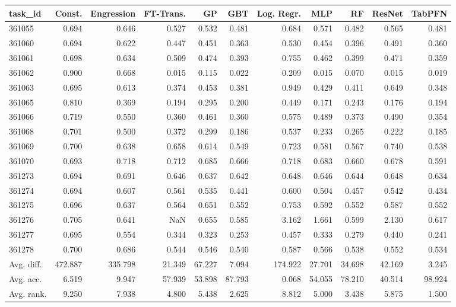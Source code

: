 \begin{tabular}{lrrrrrrrrrr}
\toprule
task\_id & Const. & Engression & FT-Trans. & GP & GBT & Log. Regr. & MLP & RF & ResNet & TabPFN \\
\midrule
361055 & 0.694 & 0.646 & 0.527 & 0.532 & 0.481 & 0.684 & 0.571 & 0.482 & 0.565 & 0.481 \\
361060 & 0.694 & 0.622 & 0.447 & 0.451 & 0.363 & 0.530 & 0.454 & 0.396 & 0.491 & 0.360 \\
361061 & 0.698 & 0.634 & 0.509 & 0.474 & 0.393 & 0.755 & 0.462 & 0.399 & 0.471 & 0.359 \\
361062 & 0.900 & 0.668 & 0.015 & 0.115 & 0.022 & 0.209 & 0.015 & 0.070 & 0.015 & 0.019 \\
361063 & 0.695 & 0.613 & 0.374 & 0.453 & 0.381 & 0.949 & 0.429 & 0.411 & 0.649 & 0.348 \\
361065 & 0.810 & 0.369 & 0.194 & 0.295 & 0.200 & 0.449 & 0.171 & 0.243 & 0.176 & 0.194 \\
361066 & 0.719 & 0.550 & 0.360 & 0.461 & 0.360 & 0.575 & 0.489 & 0.373 & 0.490 & 0.354 \\
361068 & 0.701 & 0.500 & 0.372 & 0.299 & 0.186 & 0.537 & 0.233 & 0.265 & 0.222 & 0.185 \\
361069 & 0.700 & 0.638 & 0.658 & 0.614 & 0.549 & 0.723 & 0.581 & 0.567 & 0.740 & 0.538 \\
361070 & 0.693 & 0.718 & 0.712 & 0.685 & 0.666 & 0.718 & 0.683 & 0.660 & 0.678 & 0.591 \\
361273 & 0.694 & 0.691 & 0.646 & 0.637 & 0.642 & 0.648 & 0.646 & 0.644 & 0.648 & 0.634 \\
361274 & 0.694 & 0.607 & 0.561 & 0.535 & 0.441 & 0.600 & 0.504 & 0.457 & 0.542 & 0.434 \\
361275 & 0.696 & 0.637 & 0.564 & 0.651 & 0.552 & 0.753 & 0.592 & 0.552 & 0.587 & 0.552 \\
361276 & 0.705 & 0.641 & NaN & 0.655 & 0.585 & 3.162 & 1.661 & 0.599 & 2.130 & 0.617 \\
361277 & 0.695 & 0.554 & 0.344 & 0.323 & 0.253 & 0.457 & 0.333 & 0.279 & 0.440 & 0.241 \\
361278 & 0.700 & 0.686 & 0.544 & 0.546 & 0.540 & 0.587 & 0.566 & 0.538 & 0.552 & 0.534 \\
Avg. diff. & 472.887 & 335.798 & 21.349 & 67.227 & 7.094 & 174.922 & 27.701 & 34.698 & 42.169 & 3.245 \\
Avg. acc. & 6.519 & 9.947 & 57.939 & 53.898 & 87.793 & 0.068 & 54.055 & 78.210 & 40.514 & 98.924 \\
Avg. rank. & 9.250 & 7.938 & 4.800 & 5.438 & 2.625 & 8.812 & 5.000 & 3.438 & 5.875 & 1.500 \\
\bottomrule
\end{tabular}

